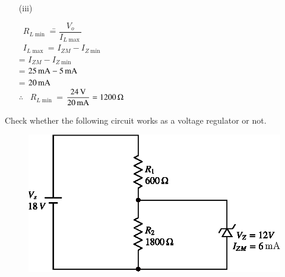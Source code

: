 \begin{solution}
\begin{itemize}
\item[(iii)] 
\begin{tabbing}
\quad ~$R_{L\min}$ \== $\dfrac{V_{o}}{I_{L\max}}$\\[6pt]
\quad ~$I_{L\max}$ \>= $I_{ZM}-I_{Z\min}$\\[6pt]
\>= $I_{ZM}-I_{Z\min}$\\[6pt]
\>= $25\text{\,mA}-5\text{\,mA}$\\[6pt]
\>= $20\text{\,mA}$\\[6pt]
$\therefore$ \ $R_{L\min}$ \>= $\dfrac{24\text{\,V}}{20\text{\,mA}}=1200\,\Omega$
\end{tabbing}
\end{itemize}
\end{solution}

\begin{example}%
Check whether the following circuit works as a voltage regulator or not.
\begin{figure}[H]
\centering
\includegraphics{chap2/exp2.29.eps}
\end{figure}
\end{example}

